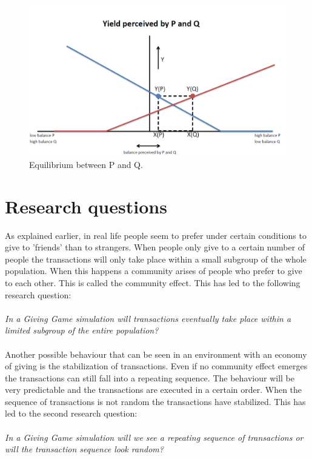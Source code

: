 \documentclass[twoside,openright]{uva-bachelor-thesis}
\begin{document}
\begin{figure}[h!]
 
  \centering
    \includegraphics[scale=0.4]{YieldCurves/yieldcurve_PQ_equilibrium}
 \caption{Equilibrium between P and Q.}
\end{figure}

\clearpage
\section{Research questions}
As explained earlier, in real life people seem to prefer under certain conditions to give to 'friends' than to strangers. When people only give to a certain number of people the transactions will only take place within a small subgroup of the whole population. When this happens a community arises of people who prefer to give to each other. This is called the community effect. This has led to the following research question:
\\
\\
\textit{In a Giving Game simulation will transactions eventually take place within a limited subgroup of the entire population?}
\\
\\
Another possible behaviour that can be seen in an environment with an economy of giving is the stabilization of transactions. Even if no community effect emerges the transactions can still fall into a repeating sequence. The behaviour will be very predictable and the transactions are executed in a certain order. When the sequence of transactions is not random the transactions have stabilized. This has led to the second research question:
\\
\\
\textit{In a Giving Game simulation will we see a repeating sequence of transactions or will the transaction sequence look random?}
\end{document}
